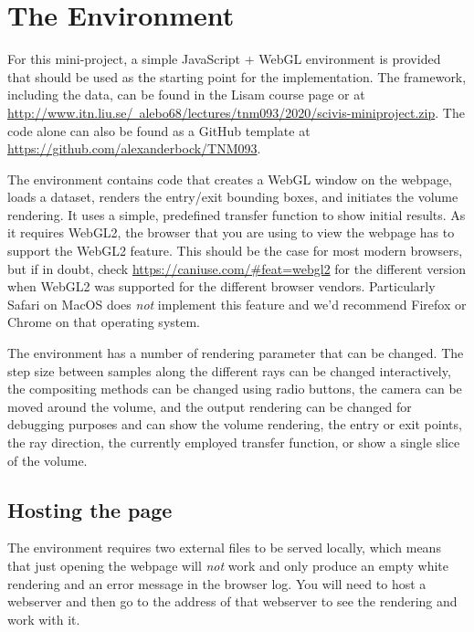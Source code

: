 \documentclass{labinstructions}
\begin{document}
\section{The Environment}
For this mini-project, a simple JavaScript + WebGL environment is provided that should be used as the starting point for the implementation.  The framework, including the data, can be found in the Lisam course page or at \href{http://www.itn.liu.se/~alebo68/lectures/tnm093/2020/scivis-miniproject.zip}{http://www.itn.liu.se/~alebo68/lectures/tnm093/2020/scivis-miniproject.zip}.  The code alone can also be found as a GitHub template at \href{https://github.com/alexanderbock/TNM093}{https://github.com/alexanderbock/TNM093}.

The environment contains code that creates a WebGL window on the webpage, loads a dataset, renders the entry/exit bounding boxes, and initiates the volume rendering.  It uses a simple, predefined transfer function to show initial results.  As it requires WebGL2, the browser that you are using to view the webpage has to support the WebGL2 feature.  This should be the case for most modern browsers, but if in doubt, check \href{https://caniuse.com/\#feat=webgl2}{https://caniuse.com/\#feat=webgl2} for the different version when WebGL2 was supported for the different browser vendors.  Particularly Safari on MacOS does \emph{not} implement this feature and we'd recommend Firefox or Chrome on that operating system.

The environment has a number of rendering parameter that can be changed.  The step size between samples along the different rays can be changed interactively, the compositing methods can be changed using radio buttons, the camera can be moved around the volume, and the output rendering can be changed for debugging purposes and can show the volume rendering, the entry or exit points, the ray direction, the currently employed transfer function, or show a single slice of the volume.

\subsection{Hosting the page}
The environment requires two external files to be served locally, which means that just opening the webpage will \emph{not} work and only produce an empty white rendering and an error message in the browser log.  You will need to host a webserver and then go to the address of that webserver to see the rendering and work with it.  
\end{document}
